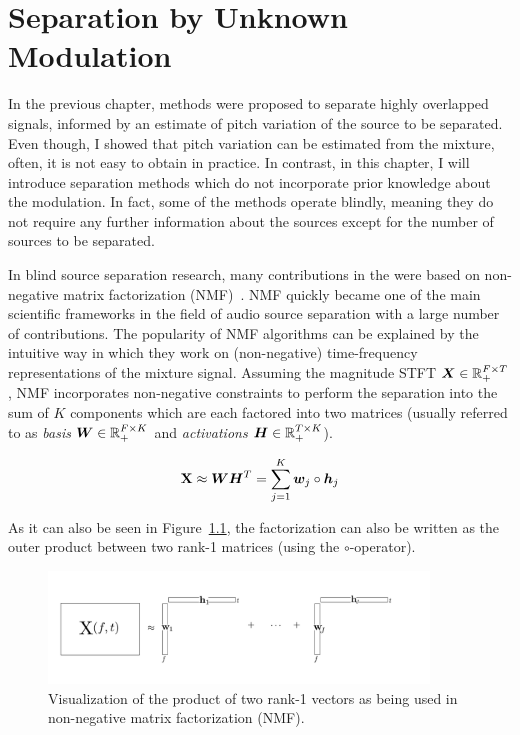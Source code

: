 \chapter{Separation by Unknown Modulation}
\label{cha:unknown}

In the previous chapter, methods were proposed to separate highly overlapped signals, informed by an estimate of pitch variation of the source to be separated.
Even though, I showed that pitch variation can be estimated from the mixture, often, it is not easy to obtain in practice.
In contrast, in this chapter, I will introduce separation methods which do not incorporate prior knowledge about the modulation. 
In fact, some of the methods operate blindly, meaning they do not require any further information about the sources except for the number of sources to be separated.
\par
In blind source separation research, many contributions in the were based on non-negative matrix factorization (NMF)~\cite{lee99, lee01}.
NMF quickly became one of the main scientific frameworks in the field of audio source separation with a large number of contributions.
The popularity of NMF algorithms can be explained by the intuitive way in which they work on (non-negative) time-frequency representations of the mixture signal.
Assuming the magnitude STFT \({\bm{X}} \in {\mathbb{R}}_{+}^{F \times T}\), NMF incorporates non-negative constraints to perform the separation into the sum of \(K\) components which are each factored into two matrices (usually referred to as \emph{basis} \({\bm{W}} \in {\mathbb{R}}_{+}^ { F \times K }\) and \emph{activations} \({\bm{H}} \in {\mathbb{R}}_{+}^ { T \times K }\)). 

\begin{equation}
   \mathbf{X} \approx {\bm{W}} {\bm{H}}^{T} = \sum\limits_{j=1}^{K} {\bm{w}}_{j} \circ {\bm{h}}_{j}
   \label{eq:vanilla_nmf}
\end{equation}

As it can also be seen in Figure~\ref{fig:nmf}, the factorization can also be written as the outer product between two rank-1 matrices (using the \(\circ\)-operator).

\begin{figure}[t]
  \centering
  \includegraphics[width=0.9\textwidth]{Chapters/06_Separation_Unknown/figures/nmf.pdf}
  \caption{Visualization of the product of two rank-1 vectors as being used in non-negative matrix factorization (NMF).}
  \label{fig:nmf}
\end{figure}


